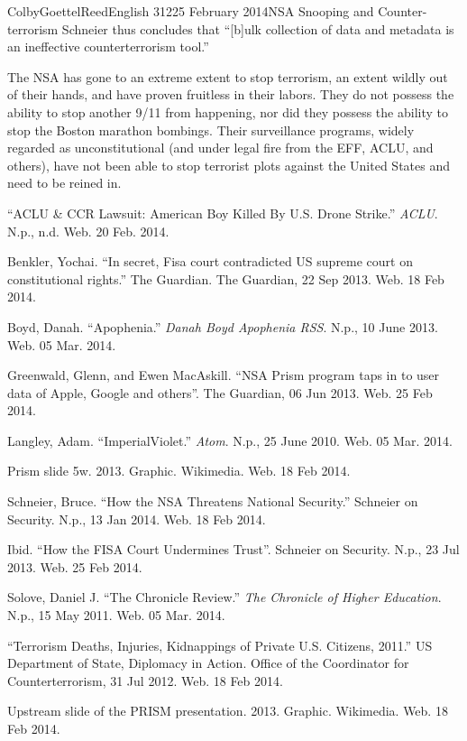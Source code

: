 \documentclass[12pt]{article}
\begin{document}
\begin{mla}{Colby}{Goettel}{Reed}{English 312}{25 February 2014}{NSA Snooping and Counter-terrorism}
Schneier thus concludes that ``[b]ulk collection of data and metadata is an ineffective counterterrorism tool.''

The NSA has gone to an extreme extent to stop terrorism, an extent wildly out of their hands, and have proven fruitless in their labors. They do not possess the ability to stop another 9/11 from happening, nor did they possess the ability to stop the Boston marathon bombings. Their surveillance programs, widely regarded as unconstitutional (and under legal fire from the EFF, ACLU, and others), have not been able to stop terrorist plots against the United States and need to be reined in.

\begin{workscited}
    \bibent ``ACLU \& CCR Lawsuit: American Boy Killed By U.S. Drone Strike.'' \textit{ACLU}. N.p., n.d. Web. 20 Feb. 2014.
    
    \bibent Benkler, Yochai. ``In secret, Fisa court contradicted US supreme court on constitutional rights.'' The Guardian. The Guardian, 22 Sep 2013. Web. 18 Feb 2014.
    
    \bibent Boyd, Danah. ``Apophenia.'' \textit{Danah Boyd Apophenia RSS}. N.p., 10 June 2013. Web. 05 Mar. 2014.
    
    \bibent Greenwald, Glenn, and Ewen MacAskill. ``NSA Prism program taps in to user data of Apple, Google and others''. The Guardian, 06 Jun 2013. Web. 25 Feb 2014.
    
    \bibent Langley, Adam. ``ImperialViolet.'' \textit{Atom}. N.p., 25 June 2010. Web. 05 Mar. 2014.
    
    \bibent Prism slide 5w. 2013. Graphic. Wikimedia. Web. 18 Feb 2014.
    
    \bibent Schneier, Bruce. ``How the NSA Threatens National Security.'' Schneier on Security. N.p., 13 Jan 2014. Web. 18 Feb 2014.
    
    \bibent Ibid. ``How the FISA Court Undermines Trust''. Schneier on Security. N.p., 23 Jul 2013. Web. 25 Feb 2014.
    
    \bibent Solove, Daniel J. ``The Chronicle Review.'' \textit{The Chronicle of Higher Education}. N.p., 15 May 2011. Web. 05 Mar. 2014.
    
    \bibent ``Terrorism Deaths, Injuries, Kidnappings of Private U.S. Citizens, 2011.'' US Department of State, Diplomacy in Action. Office of the Coordinator for Counterterrorism, 31 Jul 2012. Web. 18 Feb 2014.
    
    \bibent Upstream slide of the PRISM presentation. 2013. Graphic. Wikimedia. Web. 18 Feb 2014.
\end{workscited}

\end{mla}
\end{document}
